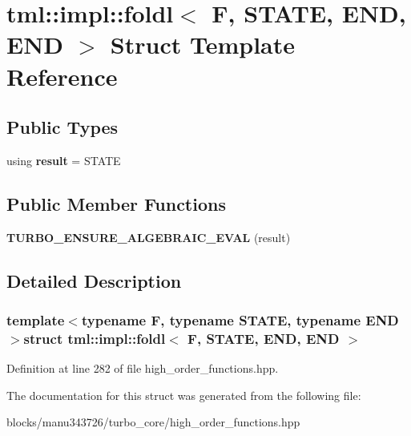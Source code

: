 \hypertarget{structtml_1_1impl_1_1foldl_3_01_f_00_01_s_t_a_t_e_00_01_e_n_d_00_01_e_n_d_01_4}{\section{tml\+:\+:impl\+:\+:foldl$<$ F, S\+T\+A\+T\+E, E\+N\+D, E\+N\+D $>$ Struct Template Reference}
\label{structtml_1_1impl_1_1foldl_3_01_f_00_01_s_t_a_t_e_00_01_e_n_d_00_01_e_n_d_01_4}
}
\subsection*{Public Types}
\begin{DoxyCompactItemize}
\item 
\hypertarget{structtml_1_1impl_1_1foldl_3_01_f_00_01_s_t_a_t_e_00_01_e_n_d_00_01_e_n_d_01_4_a8003ed00cb38384ab91e33b7bdfefb10}{using {\bfseries result} = S\+T\+A\+T\+E}\label{structtml_1_1impl_1_1foldl_3_01_f_00_01_s_t_a_t_e_00_01_e_n_d_00_01_e_n_d_01_4_a8003ed00cb38384ab91e33b7bdfefb10}

\end{DoxyCompactItemize}
\subsection*{Public Member Functions}
\begin{DoxyCompactItemize}
\item 
\hypertarget{structtml_1_1impl_1_1foldl_3_01_f_00_01_s_t_a_t_e_00_01_e_n_d_00_01_e_n_d_01_4_af779cc468c5410c35f99e7dd032d42e2}{{\bfseries T\+U\+R\+B\+O\+\_\+\+E\+N\+S\+U\+R\+E\+\_\+\+A\+L\+G\+E\+B\+R\+A\+I\+C\+\_\+\+E\+V\+A\+L} (result)}\label{structtml_1_1impl_1_1foldl_3_01_f_00_01_s_t_a_t_e_00_01_e_n_d_00_01_e_n_d_01_4_af779cc468c5410c35f99e7dd032d42e2}

\end{DoxyCompactItemize}


\subsection{Detailed Description}
\subsubsection*{template$<$typename F, typename S\+T\+A\+T\+E, typename E\+N\+D$>$struct tml\+::impl\+::foldl$<$ F, S\+T\+A\+T\+E, E\+N\+D, E\+N\+D $>$}



Definition at line 282 of file high\+\_\+order\+\_\+functions.\+hpp.



The documentation for this struct was generated from the following file\+:\begin{DoxyCompactItemize}
\item 
blocks/manu343726/turbo\+\_\+core/high\+\_\+order\+\_\+functions.\+hpp\end{DoxyCompactItemize}
